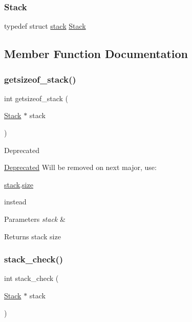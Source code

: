 \subsubsection{\texorpdfstring{Stack}{Stack}}
{\footnotesize\ttfamily typedef struct \hyperlink{structstack}{stack} \hyperlink{structstack_aa7883e8bf747b9dedec990b539df2cc0}{Stack}}



\subsection{Member Function Documentation}
\mbox{\label{structstack_a1f99bec6acb65ce01f2079dc1ea2c117}} 
\subsubsection{\texorpdfstring{getsizeof\+\_\+stack()}{getsizeof\_stack()}}
{\footnotesize\ttfamily int getsizeof\+\_\+stack (\begin{DoxyParamCaption}\item[{\hyperlink{structstack_aa7883e8bf747b9dedec990b539df2cc0}{Stack} $\ast$}]{stack }\end{DoxyParamCaption})}

\begin{DoxyRefDesc}{Deprecated}
\item[\hyperlink{deprecated__deprecated000002}{Deprecated}]Will be removed on next major, use\+: \end{DoxyRefDesc}

\begin{DoxyCode}
\hyperlink{structstack}{stack}.\hyperlink{structstack_a439227feff9d7f55384e8780cfc2eb82}{size}
\end{DoxyCode}
 instead 
\begin{DoxyParams}{Parameters}
{\em stack} & \\
\hline
\end{DoxyParams}
\begin{DoxyReturn}{Returns}
stack size 
\end{DoxyReturn}
\mbox{\label{structstack_ac5b24a79f9821527a6673b7582ae838b}} 
\subsubsection{\texorpdfstring{stack\+\_\+check()}{stack\_check()}}
{\footnotesize\ttfamily int stack\+\_\+check (\begin{DoxyParamCaption}\item[{\hyperlink{structstack_aa7883e8bf747b9dedec990b539df2cc0}{Stack} $\ast$}]{stack }\end{DoxyParamCaption})}

